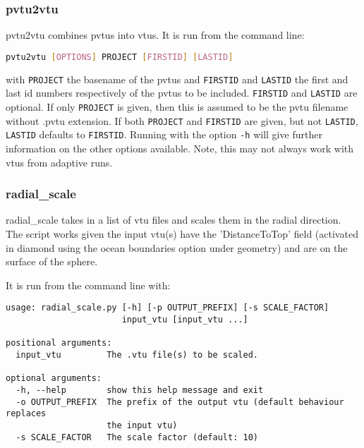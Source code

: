 \subsubsection{pvtu2vtu}
\label{sec:pvtu2vtu}
pvtu2vtu combines pvtus into vtus. It is run from the command line:
\begin{lstlisting}[language = Bash]
pvtu2vtu [OPTIONS] PROJECT [FIRSTID] [LASTID]
\end{lstlisting}
with \lstinline[language = Bash]+PROJECT+ the basename of the pvtus and \lstinline[language = Bash]+FIRSTID+ and \lstinline[language = Bash]+LASTID+ the first and last id numbers respectively of the pvtus to be included. \lstinline[language = Bash]+FIRSTID+ and \lstinline[language = Bash]+LASTID+ are optional.  If only \lstinline[language = Bash]+PROJECT+ is given, then this is assumed to be the pvtu filename without .pvtu extension.  If both \lstinline[language = Bash]+PROJECT+ and \lstinline[language = Bash]+FIRSTID+ are given, but not \lstinline[language = Bash]+LASTID+, \lstinline[language = Bash]+LASTID+ defaults to \lstinline[language = Bash]+FIRSTID+. Running with the option \lstinline[language = Bash]+-h+ will give further information on the other options available. Note, this may not always work with vtus from adaptive runs.


\subsubsection{radial\_scale}
\label{sec:radscal}
radial\_scale takes in a list of vtu files and scales them in the radial direction. The script works given the input vtu(s) have the 'DistanceToTop' field (activated in diamond using the ocean boundaries option under geometry) and are on the surface of the sphere.

It is run from the command line with:
\begin{lstlisting}
usage: radial_scale.py [-h] [-p OUTPUT_PREFIX] [-s SCALE_FACTOR]
                       input_vtu [input_vtu ...]

positional arguments:
  input_vtu         The .vtu file(s) to be scaled.

optional arguments:
  -h, --help        show this help message and exit
  -o OUTPUT_PREFIX  The prefix of the output vtu (default behaviour replaces
                    the input vtu)
  -s SCALE_FACTOR   The scale factor (default: 10)
\end{lstlisting}

